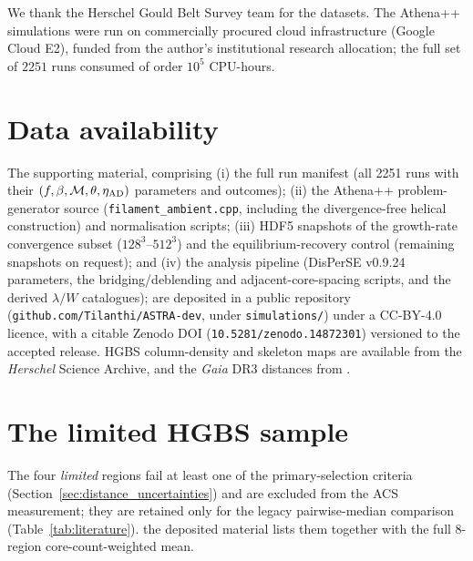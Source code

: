 \documentclass[usenatbib,twoside,twocolumn]{mnras}
\begin{document}
We thank the Herschel Gould Belt Survey team for the datasets. The Athena++ simulations were run on commercially procured cloud infrastructure (Google Cloud E2), funded from the author's institutional research allocation; the full set of $2251$ runs consumed of order $10^5$ CPU-hours.

\section*{Data availability}

The supporting material, comprising (i) the full run manifest (all 2251 runs with their $(f,\beta,\mathcal{M},\theta,\eta_{\rm AD})$ parameters and outcomes); (ii) the Athena++ problem-generator source (\texttt{filament\_ambient.cpp}, including the divergence-free helical construction) and normalisation scripts; (iii) HDF5 snapshots of the growth-rate convergence subset ($128^3$--$512^3$) and the equilibrium-recovery control (remaining snapshots on request); and (iv) the analysis pipeline (DisPerSE v0.9.24 parameters, the bridging/deblending and adjacent-core-spacing scripts, and the derived $\lambda/W$ catalogues); are deposited in a public repository (\texttt{github.com/Tilanthi/ASTRA-dev}, under \texttt{simulations/}) under a CC-BY-4.0 licence, with a citable Zenodo DOI (\texttt{10.5281/zenodo.14872301}) versioned to the accepted release. HGBS column-density and skeleton maps are available from the \textit{Herschel} Science Archive, and the \textit{Gaia} DR3 distances from \citet{Zhang2023}.


\appendix

\section{The limited HGBS sample}
\label{sec:limited_sample}
The four \emph{limited} regions fail at least one of the primary-selection criteria (Section~\ref{sec:distance_uncertainties}) and are excluded from the ACS measurement; they are retained only for the legacy pairwise-median comparison (Table~\ref{tab:literature}). the deposited material lists them together with the full 8-region core-count-weighted mean.
\end{document}
